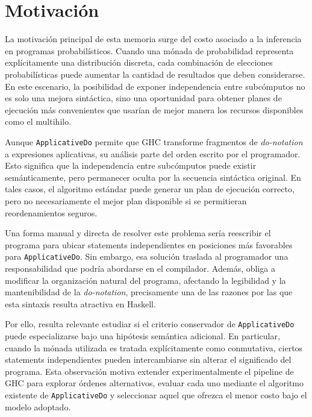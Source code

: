 
\section{Motivación}

La motivación principal de esta memoria surge del costo asociado a la inferencia en programas probabilísticos. Cuando una mónada de probabilidad representa explícitamente una distribución discreta, cada combinación de elecciones probabilísticas puede aumentar la cantidad de resultados que deben considerarse. En este escenario, la posibilidad de exponer independencia entre subcómputos no es solo una mejora sintáctica, sino una oportunidad para obtener planes de ejecución más convenientes que usarían de mejor manera los recursos disponibles como el multihilo.

Aunque \texttt{ApplicativeDo} permite que \textsf{GHC} transforme fragmentos de \textit{do-notation} a expresiones aplicativas, su análisis parte del orden escrito por el programador. Esto significa que la independencia entre subcómputos puede existir semánticamente, pero permanecer oculta por la secuencia sintáctica original. En tales casos, el algoritmo estándar puede generar un plan de ejecución correcto, pero no necesariamente el mejor plan disponible si se permitieran reordenamientos seguros.

Una forma manual y directa de resolver este problema sería reescribir el programa para ubicar statements independientes en posiciones más favorables para \texttt{ApplicativeDo}. Sin embargo, esa solución traslada al programador una responsabilidad que podría abordarse en el compilador. Además, obliga a modificar la organización natural del programa, afectando la legibilidad y la mantenibilidad de la \textit{do-notation}, precisamente una de las razones por las que esta sintaxis resulta atractiva en \textsf{Haskell}.

Por ello, resulta relevante estudiar si el criterio conservador de \texttt{ApplicativeDo} puede especializarse bajo una hipótesis semántica adicional. En particular, cuando la mónada utilizada es tratada explícitamente como conmutativa, ciertos statements independientes pueden intercambiarse sin alterar el significado del programa. Esta observación motiva extender experimentalmente el pipeline de \textsf{GHC} para explorar órdenes alternativos, evaluar cada uno mediante el algoritmo existente de \texttt{ApplicativeDo} y seleccionar aquel que ofrezca el menor costo bajo el modelo adoptado.
